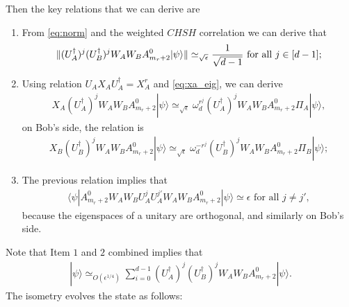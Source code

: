\documentclass[11pt,letterpaper]{article}
\newcommand{\ket}[1]{|#1\rangle}
\newcommand{\bra}[1]{\langle#1|}
\newcommand{\ct}{^{\dagger}}
\DeclarePairedDelimiter{\norm}{\lVert}{\rVert}
\newcommand{\1}{\mathbb{1}}
\newcommand{\appd}[1]{\simeq_{#1}}
\theoremstyle{definition}
\begin{document}
Then the key relations that we can derive are
\begin{enumerate}
	\item From \cref{eq:norm} and the weighted $CHSH$ correlation we can derive that 
	\begin{align}
	\norm{(U_A\ct)^j (U_B\ct)^{j} W_AW_B A_{m_r+2}^0\ket{\psi}} \appd{\sqrt{\epsilon}} \frac{1}{\sqrt{d-1}} \text{ for all } j \in [d-1];
	\end{align}
	\item Using relation $U_AX_AU_A\ct = X_A^r$ and \cref{eq:xa_eig}, we can derive
	\begin{align}
		X_A (U_A\ct)^j W_AW_B A_{m_r+2}^0 \ket{\psi} \appd{\sqrt{\epsilon}} \omega_d^{r^j} (U_A\ct)^j W_AW_B A_{m_r+2}^0\Pi_A\ket{\psi},
	\end{align}
	on Bob's side, the relation is 
	\begin{align}
		X_B (U_B\ct)^j W_AW_B A_{m_r+2}^0 \ket{\psi} \appd{\sqrt{\epsilon}} \omega_d^{-r^j} (U_B\ct)^j W_AW_B A_{m_r+2}^0\Pi_B\ket{\psi};
	\end{align}
	\item The previous relation implies that 
	\begin{align}
	\bra{\psi} A_{m_r+2}^0 W_AW_B U_A^j U_A^{j'} W_AW_B A_{m_r+2}^0 \ket{\psi} \simeq \epsilon \text{ for all }j \neq j',
	\end{align}
	because the eigenspaces of a unitary are orthogonal,
	and similarly on Bob's side.
\end{enumerate}
Note that Item $1$ and $2$ combined implies that
\begin{align}
	\ket{\psi} \appd{O(\epsilon^{1/4})} \sum_{i=0}^{d-1} (U_A\ct)^j (U_B\ct)^j W_AW_B A_{m_r+2}^0 \ket{\psi}.
\end{align}
The isometry evolves the state as follows:
\end{document}
